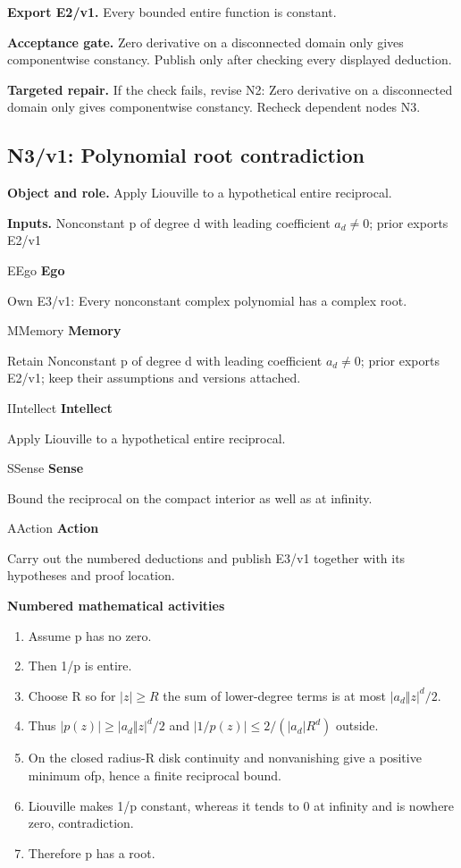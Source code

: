 \documentclass[preprint,12pt,aps,pra,showkeys,amsmath,amssymb,superscriptaddress,floatfix]{revtex4-2}
\theoremstyle{definition}
\theoremstyle{remark}
\newcommand{\mmfaculty}[3]{%
 \begin{mmfacultybox}{#1}{#2}
 {\sffamily\bfseries\color{MMBlue}#2}\par\smallskip #3
 \end{mmfacultybox}}
\newcommand{\field}[2]{\par\smallskip\noindent\textbf{#1.} #2\par}
\begin{document}
\field{Export E2/v1}{Every bounded entire function is constant.}

\field{Acceptance gate}{Zero derivative on a disconnected domain only gives componentwise
constancy. Publish only after checking every displayed deduction.}

\field{Targeted repair}{If the check fails, revise N2: Zero derivative on a disconnected domain
only gives componentwise constancy. Recheck dependent nodes N3.}

\clearpage

\subsection{N3/v1: Polynomial root contradiction}

\field{Object and role}{Apply Liouville to a hypothetical entire reciprocal.}

\field{Inputs}{Nonconstant p of degree d with leading coefficient \(a_d\ne 0\); prior
exports E2/v1}

\mmfaculty{E}{Ego}{Own E3/v1: Every nonconstant complex polynomial has a complex root.}

\mmfaculty{M}{Memory}{Retain Nonconstant p of degree d with leading coefficient \(a_d\ne 0\);
prior exports E2/v1; keep their assumptions and versions attached.}

\mmfaculty{I}{Intellect}{Apply Liouville to a hypothetical entire reciprocal.}

\mmfaculty{S}{Sense}{Bound the reciprocal on the compact interior as well as at infinity.}

\mmfaculty{A}{Action}{Carry out the numbered deductions and publish E3/v1 together with its
hypotheses and proof location.}

\smallskip\noindent\textbf{Numbered mathematical activities}

\begin{enumerate}[label=N3.\arabic*,leftmargin=3.4em]

\item Assume p has no zero.

\item Then 1/p is entire.

\item Choose R so for \(|z|\ge R\) the sum of lower-degree terms is at most
\(|a_d\Vert z|^d/2\).

\item Thus \(|p(z)|\ge |a_d\Vert z|^d/2\) and \(|1/p(z)|\le 2/(|a_d|R^d)\)
outside.

\item On the closed radius-R disk continuity and nonvanishing give a positive
minimum of\textbar p\textbar, hence a finite reciprocal bound.

\item Liouville makes 1/p constant, whereas it tends to 0 at infinity and is
nowhere zero, contradiction.

\item Therefore p has a root.

\end{enumerate}
\end{document}
